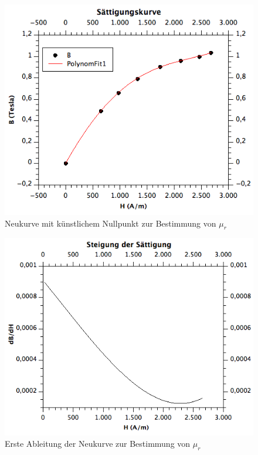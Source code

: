 \documentclass[12pt,a4paper]{article}
\begin{document}
\begin{figure}[H]
	\centering
	\includegraphics[scale=0.7]{./figures/Trafo_W_saettigung02.png}
	\caption{Neukurve mit künstlichem Nullpunkt zur Bestimmung von $\mu_r$}
	\label{fig:Trafo_W_saettigung}
\end{figure}
\begin{figure}[H]
	\centering
	\includegraphics[scale=0.6]{./figures/Trafo_W_saettigung-steigung.png}
	\caption{Erste Ableitung der Neukurve zur Bestimmung von $\mu_r$}
	\label{fig:Trafo_W_saettigung}
\end{figure}
\end{document}
